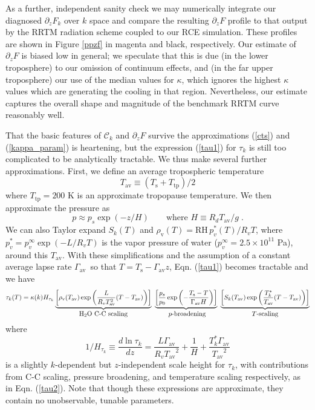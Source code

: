 \documentclass[10pt]{article}
\newcommand{\beqn}{\begin{equation}}
\newcommand{\eeqn}{\end{equation}}
\newcommand{\eqnref}[1]{(\ref{#1})}
\newcommand{\n}{\nonumber}
\newcommand{\der}[2]{\ensuremath{\frac{d #1}{d #2}}}
\newcommand{\ppz}{\ensuremath{\partial_z}}
\newcommand{\htwo}{\ensuremath{\mathrm{H_2O}}}
\newcommand{\FLW}{\ensuremath{F}}
\newcommand{\cool}{\ensuremath{\mathcal{C}}}
\newcommand{\rhov}{\ensuremath{\rho_\mathrm{v}}}
\newcommand{\Tav}{\ensuremath{T_\mathrm{av}}}
\newcommand{\Ts}{\ensuremath{T_\mathrm{s}}}
\newcommand{\ps}{\ensuremath{p_s}}
\newcommand{\RH}{\ensuremath{\mathrm{RH}}}
\newcommand{\Ttp}{\ensuremath{T_\mathrm{tp}}}
\newcommand{\gammaav}{\ensuremath{\Gamma_\mathrm{av}}}
\newcommand{\Htauk}{\ensuremath{H_{\tau_k}}}
\begin{document}
As a further, independent sanity check we may numerically integrate our diagnosed $\ppz \FLW_k$ over $k$ space and compare the resulting $\ppz F$ profile to that output by the RRTM radiation scheme coupled to our RCE simulation. These profiles are shown in Figure
\ref{ppzf} in magenta and black, respectively. Our estimate of $\ppz \FLW$ is biased low in general; we speculate that this is due (in the lower troposphere) to our omission of continuum effects, and (in the far upper troposphere) our use of the median values for $\kappa$, which ignores the highest $\kappa$ values which are generating the cooling in that region. Nevertheless, our estimate captures the overall shape and magnitude of the benchmark RRTM curve reasonably well.

That the basic features of $\cool_k$  and $\ppz \FLW$ survive the approximations \eqnref{cts} and \eqnref{kappa_param} is heartening, but the expression \eqnref{tau1} for $\tau_k$ is still too complicated to be analytically tractable. We thus make several further approximations. First, we define an average tropospheric temperature 
\beqn
	\Tav \equiv (\Ts + \Ttp)/2
	\n
\eeqn
 where $\Ttp = 200$ K is an approximate tropopause temperature. We  then approximate the pressure as 
	\beqn 
		p \approx \ps \exp(-z/H)\quad \quad \mbox{where $H \equiv  R_d \Tav/g$} \; .
	\eeqn  
	We can also Taylor expand $S_k(T)$ and $\rhov(T) = \RH\, p_v^*(T)/R_ vT$,  where $p_v^* = p_v^\infty \exp(-L/R_vT)$ is the vapor pressure of water ($p_v^\infty = 2.5\times 10^{11} $ Pa), around this \Tav. With these simplifications  and the assumption of a constant average lapse rate \gammaav\ so that $T=\Ts-\gammaav z$, Eqn. \eqnref{tau1} becomes tractable and we have	
	\beqn
		\tau_k(T) = \kappa(k)\Htauk \underbrace{\left[\rhov(\Tav)\exp\left(\frac{L}{R_v\Tav^2}(T-\Tav)\right)\right]}_{\mbox{\htwo\ C-C scaling}}\
							  \underbrace{\left[\frac{\ps}{p_0}\exp\left(-\frac{\Ts-T}{\gammaav H}\right)\right]}_{\mbox{ $p$-broadening}}\
							  \underbrace{\left[S_k(\Tav)\exp\left(\frac{T^*_k}{\Tav}(T-\Tav)\right)\right]}_{\mbox{$T$-scaling}}
	\label{tau2}
	\eeqn
where 
	\beqn
		1/\Htauk \equiv \der{\ln \tau_k}{z} = \frac{L\gammaav}{R_v \Tav^2}+ \frac{1}{H} + \frac{T_k^*\gammaav}{\Tav^2}  
	\eeqn
		is a slightly $k$-dependent but $z$-independent scale height for $\tau_k$, with contributions from C-C scaling, pressure broadening, and temperature scaling respectively, as in Eqn. \eqnref{tau2}. Note that though these expressions are approximate, they contain no unobservable, tunable parameters. 		
		
\end{document}
